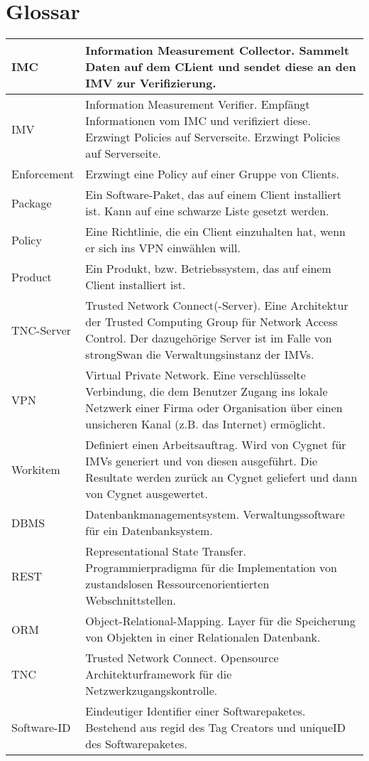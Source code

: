 \chapter{Glossar}
\begin{tabular}{|l|l|}
\hline  IMC & Information Measurement Collector. Sammelt Daten auf dem CLient und sendet diese an den IMV zur Verifizierung.\\
\hline IMV & Information Measurement Verifier. Empfängt Informationen vom IMC und verifiziert diese. Erzwingt Policies auf Serverseite. Erzwingt Policies auf Serverseite.\\
\hline Enforcement & Erzwingt eine Policy auf einer Gruppe von Clients.\\
\hline Package & Ein Software-Paket, das auf einem Client installiert ist. Kann auf eine schwarze Liste
gesetzt werden.\\
Policy & Eine Richtlinie, die ein Client einzuhalten hat, wenn er sich ins VPN einwählen will.\\
\hline
Product & Ein Produkt, bzw. Betriebssystem, das auf einem Client installiert ist.\\
\hline
TNC-Server & Trusted Network Connect(-Server). Eine Architektur der Trusted Computing Group für
Network Access Control. Der dazugehörige Server ist im Falle von strongSwan die
Verwaltungsinstanz der IMVs.\\
VPN & Virtual Private Network. Eine verschlüsselte Verbindung, die dem Benutzer Zugang ins
lokale Netzwerk einer Firma oder Organisation über einen unsicheren Kanal (z.B. das
Internet) ermöglicht.\\
\hline Workitem & Definiert einen Arbeitsauftrag. Wird von Cygnet für IMVs generiert und von diesen
ausgeführt. Die Resultate werden zurück an Cygnet geliefert und dann von Cygnet
ausgewertet.\\
\hline 
DBMS & Datenbankmanagementsystem. Verwaltungssoftware für ein Datenbanksystem.\\
\hline
REST & Representational State Transfer. Programmierpradigma für die Implementation von zustandslosen Ressourcenorientierten Webschnittstellen.\\
\hline
ORM & Object-Relational-Mapping. Layer für die Speicherung von Objekten in einer Relationalen Datenbank.\\
\hline
TNC & Trusted Network Connect. Opensource Architekturframework für die Netzwerkzugangskontrolle.\\
\hline
Software-ID & Eindeutiger Identifier einer Softwarepaketes. Bestehend aus regid des Tag Creators und uniqueID des Softwarepaketes.\\

\end{tabular}
